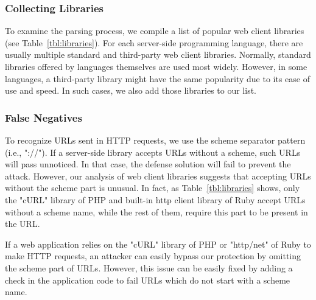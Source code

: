 \subsubsection{Collecting Libraries}
To examine the parsing process, we compile a list of popular web client libraries (see Table~\ref{tbl:libraries}). For each server-side programming language, there are usually multiple standard and third-party web client libraries. Normally, standard libraries offered by languages themselves are used most widely. However, in some languages, a third-party library might have the same popularity due to its ease of use and speed. In such cases, we also add those libraries to our list. %

\subsubsection{False Negatives}
To recognize URLs sent in HTTP requests, we use the scheme separator pattern (i.e., "://"). If a server-side library accepts URLs without a scheme, such URLs will pass unnoticed. In that case, the defense solution will fail to prevent the attack. However, our analysis of web client libraries suggests that accepting URLs without the scheme part is unusual. In fact, as Table~\ref{tbl:libraries} shows, only the "cURL" library of PHP and built-in http client library of Ruby accept URLs without a scheme name, while the rest of them, require this part to be present in the URL.  

If a web application relies on the "cURL" library of PHP or "http/net" of Ruby to make HTTP requests, an attacker can easily bypass our protection by omitting the scheme part of URLs. However, this issue can be easily fixed by adding a check in the application code to fail URLs which do not start with a scheme name.  

